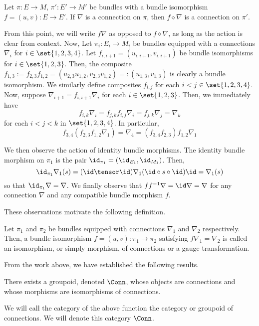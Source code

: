 \documentclass[\PRJWD/Thick_TQFTs_and_Quantum_Information.tex]{subfiles}
\begin{document}
\begin{thm}
Let $\pi : E \to M$, $\pi' : E' \to M'$ be bundles with a bundle isomorphism
$f = (u, v) : E \to E'$. If $\nabla$ is a connection on $\pi$, then
$f \diamond \nabla$ is a connection on $\pi'$.
\end{thm}

From this point, we will write $f\nabla$ as opposed to $f \diamond \nabla$,
as long as the action is clear from context. Now, Let $\pi_i : E_i \to M_i$ be
bundles equipped with a connections
$\nabla_i$ for $i \in \set{1, 2, 3, 4}$. Let
$f_{i, i + 1} = (u_{i, i + 1}, v_{i, i + 1})$
be bundle isomorphisms for $i \in \set{1, 2, 3}$. Then, the composite
$f_{1, 3} := f_{2, 3}f_{1, 2} = (u_{2, 3}u_{1, 2}, v_{2, 3}v_{1, 2})
=: (u_{1, 3}, v_{1, 3})$ is clearly a bundle isomorphism. We similarly define
composites $f_{i, j}$ for each $i < j \in \set{1, 2, 3, 4}$. Now, suppose
$\nabla_{i + 1} = f_{i, i + 1}\nabla_i$ for each $i \in \set{1, 2, 3}$. Then, we
immediately have
\[
  f_{i, k}\nabla_i = f_{j, k}f_{i, j}\nabla_i = f_{j, k}\nabla_j = \nabla_k
\]
for each $i < j < k$ in $\set{1, 2, 3, 4}$. In particular,
\[
  f_{3, 4}(f_{2, 3}f_{1, 2}\nabla_1) = \nabla_4
    = (f_{3, 4}f_{2, 3})f_{1, 2}\nabla_1
\]

We then observe the action of identity bundle morphisms. The identity bundle
morphism on $\pi_1$ is the pair $\id_{\pi_1} = (\id_{E_1}, \id_{M_1})$. Then,
\[
  \id_{\pi_1}\nabla_1(s)
    = (\id \tensor \id) \nabla_1(\id \circ s \circ \id) \id
    = \nabla_1(s)
\]
so that $\id_{\pi_1}\nabla = \nabla$. We finally observe that
$ff^{-1}\nabla = \id\nabla = \nabla$ for any connection $\nabla$ and any
compatible bundle morphism $f$.

These observations motivate the following definition.
\begin{defn}
Let $\pi_1$ and $\pi_2$ be bundles equipped with connections $\nabla_1$ and
$\nabla_2$ respectively. Then, a bundle isomorphism
$f = (u, v) : \pi_1 \to \pi_2$ satisfying $f\nabla_1 = \nabla_2$ is called an
isomorphism, or simply morphism, of connections or a gauge transformation.
\end{defn}

From the work above, we have established the following results.
\begin{thm}
There exists a groupoid, denoted $\Conn$, whose objects are connections and
whose morphisms are isomorphisms of connections.
\end{thm}
\begin{defn}
We will call the category of the above function the category or groupoid of
connections. We will denote this category $\Conn$.
\end{defn}
\end{document}
